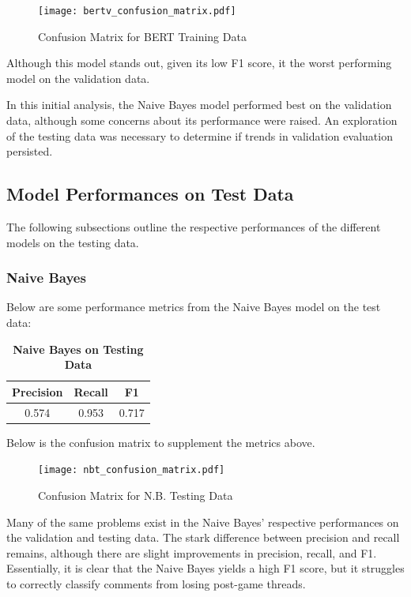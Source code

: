 \documentclass[twocolumn]{article}
\begin{document}
\begin{figure}[H]
    \centering
    \texttt{[image: bertv\_confusion\_matrix.pdf]}
    \caption{Confusion Matrix for BERT Training Data}
\end{figure}

Although this model stands out, given its low F1 score, it the worst performing model on the validation data.

In this initial analysis, the Naive Bayes model performed best on the validation data, although some concerns about its performance were raised. An exploration of the testing data was necessary to determine if trends in validation evaluation persisted.

\subsection{Model Performances on Test Data}

The following subsections outline the respective performances of the different models on the testing data.

\subsubsection{Naive Bayes}

Below are some performance metrics from the Naive Bayes model on the test data:

\begin{table}[H]
\centering %
\caption{\textbf{Naive Bayes on Testing Data}} 

\begin{tabular}{ccc} 
\toprule
Precision & Recall & F1 \\ 
\midrule
0.574 & 0.953 & 0.717 \\
\bottomrule
\end{tabular}
\end{table}

Below is the confusion matrix to supplement the metrics above.

\begin{figure}[H]
    \centering
    \texttt{[image: nbt\_confusion\_matrix.pdf]}
    \caption{Confusion Matrix for N.B. Testing Data}
\end{figure}

Many of the same problems exist in the Naive Bayes' respective performances on the validation and testing data. The stark difference between precision and recall remains, although there are slight improvements in precision, recall, and F1. Essentially, it is clear that the Naive Bayes yields a high F1 score, but it struggles to correctly classify comments from losing post-game threads.
\end{document}
